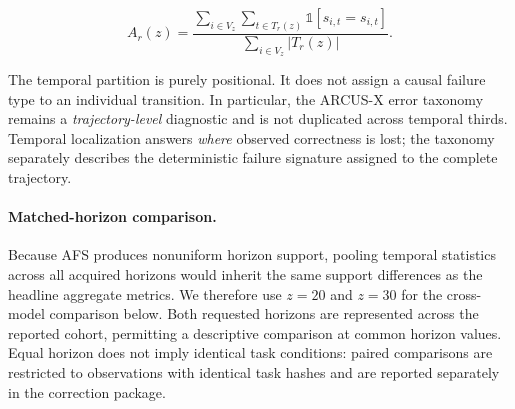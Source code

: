 \documentclass{article}
\begin{document}
\begin{equation}
    A_r(z)
    =
    \frac{
        \displaystyle
        \sum_{i \in V_z}
        \sum_{t \in T_r(z)}
        \mathbb{1}
        \left[
            \hat{s}_{i,t}=s_{i,t}
        \right]
    }{
        \displaystyle
        \sum_{i \in V_z}
        |T_r(z)|
    }.
    \label{eq:temporal_accuracy}
\end{equation}

The temporal partition is purely positional. It does not assign a causal
failure type to an individual transition. In particular, the ARCUS-X error
taxonomy remains a \emph{trajectory-level} diagnostic and is not duplicated
across temporal thirds. Temporal localization answers \emph{where} observed
correctness is lost; the taxonomy separately describes the deterministic
failure signature assigned to the complete trajectory.

\paragraph{Matched-horizon comparison.}
Because AFS produces nonuniform horizon support, pooling temporal statistics
across all acquired horizons would inherit the same support differences as the
headline aggregate metrics. We therefore use $z=20$ and $z=30$ for the
cross-model comparison below. Both requested horizons are represented across the reported cohort, permitting a descriptive comparison at common horizon values. Equal horizon does not imply identical task conditions: paired comparisons are restricted to observations with identical task hashes and are reported separately in the correction package.
\end{document}
